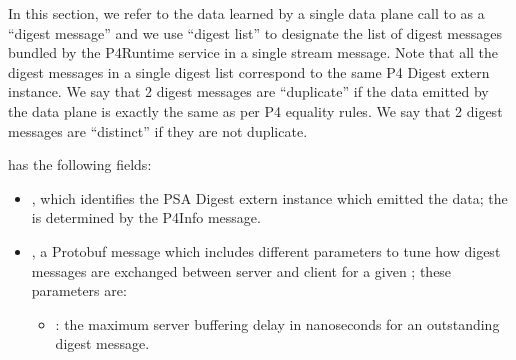 \documentclass[11pt]{article}
\begin{document}
{%
In this section, we refer to the data learned by a single data plane call to
 as a \textquotedblleft{}digest message\textquotedblright{} and we use \textquotedblleft{}digest list\textquotedblright{} to designate
the list of digest messages bundled by the P4Runtime service in a single
 stream message. Note that all the digest messages in a single
digest list correspond to the same P4 Digest extern instance. We say that 2
digest messages are \textquotedblleft{}duplicate\textquotedblright{} if the data emitted by the data plane is exactly
the same as per P4 equality rules. We say that 2 digest messages are \textquotedblleft{}distinct\textquotedblright{}
if they are not duplicate.%

 has the following fields:%

\begin{itemize}%

\item{}
, which identifies the PSA Digest extern instance which emitted the
data; the  is determined by the P4Info message.%

\item{}
, a Protobuf message which includes different parameters to tune how
digest messages are exchanged between server and client for a given
; these parameters are:%

\begin{itemize}[noitemsep,topsep=\mdcompacttopsep]%

\item{}: the maximum server buffering delay in nanoseconds for an
outstanding digest message.%


\end{itemize}
\end{itemize}}
\end{document}

